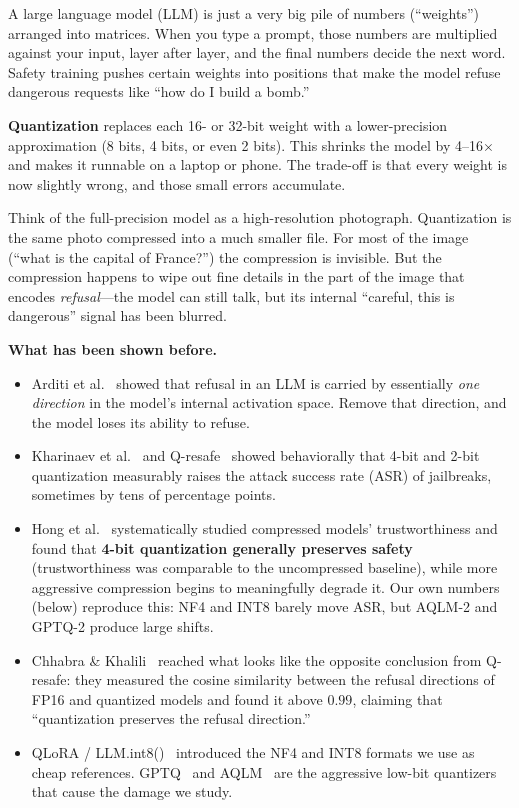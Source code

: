 \documentclass[11pt]{article}
\begin{document}
A large language model (LLM) is just a very big pile of numbers (``weights'') arranged into matrices. When you type a prompt, those numbers are multiplied against your input, layer after layer, and the final numbers decide the next word. Safety training pushes certain weights into positions that make the model refuse dangerous requests like ``how do I build a bomb.''

\textbf{Quantization} replaces each 16- or 32-bit weight with a lower-precision approximation (8 bits, 4 bits, or even 2 bits). This shrinks the model by 4--16$\times$ and makes it runnable on a laptop or phone. The trade-off is that every weight is now slightly wrong, and those small errors accumulate.

\begin{conceptbox}[An analogy]
Think of the full-precision model as a high-resolution photograph. Quantization is the same photo compressed into a much smaller file. For most of the image (``what is the capital of France?'') the compression is invisible. But the compression happens to wipe out fine details in the part of the image that encodes \emph{refusal}---the model can still talk, but its internal ``careful, this is dangerous'' signal has been blurred.
\end{conceptbox}

\textbf{What has been shown before.}
\begin{itemize}
    \item Arditi et al.~\cite{arditi2024refusal} showed that refusal in an LLM is carried by essentially \emph{one direction} in the model's internal activation space. Remove that direction, and the model loses its ability to refuse.
    \item Kharinaev et al.~\cite{kharinaev2025} and Q-resafe~\cite{qresafe2025} showed behaviorally that 4-bit and 2-bit quantization measurably raises the attack success rate (ASR) of jailbreaks, sometimes by tens of percentage points.
    \item Hong et al.~\cite{hong2024compressed} systematically studied compressed models' trustworthiness and found that \textbf{4-bit quantization generally preserves safety} (trustworthiness was comparable to the uncompressed baseline), while more aggressive compression begins to meaningfully degrade it. Our own numbers (below) reproduce this: NF4 and INT8 barely move ASR, but AQLM-2 and GPTQ-2 produce large shifts.
    \item Chhabra \& Khalili~\cite{chhabra2025aird} reached what looks like the opposite conclusion from Q-resafe: they measured the cosine similarity between the refusal directions of FP16 and quantized models and found it above $0.99$, claiming that ``quantization preserves the refusal direction.''
    \item QLoRA / LLM.int8()~\cite{dettmers2022llmint8, dettmers2023qlora} introduced the NF4 and INT8 formats we use as cheap references. GPTQ~\cite{frantar2022gptq} and AQLM~\cite{egiazarian2024aqlm} are the aggressive low-bit quantizers that cause the damage we study.
\end{itemize}
\end{document}
